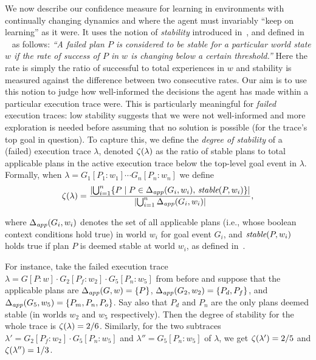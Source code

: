 We now describe our confidence measure for learning in environments with continually changing dynamics and where the agent must invariably ``keep on learning'' as it were. It uses the notion of {\em stability} introduced in~\cite{airiau09:enhancing}, and defined in ~\cite{singh10:learning} as follows:
%
\emph{``A failed plan $P$ is considered to be stable for a particular world state $w$ if the rate of success of $P$ in $w$ is changing below a certain threshold.''}
Here the rate is simply the ratio of successful to total experiences in $w$ and stability is measured against the difference between two consecutive rates.
%
Our aim is to use this notion to judge how  well-informed the decisions the agent has made within a particular execution trace were. This is particularly meaningful for \emph{failed} execution traces: low stability suggests that we were not well-informed and more exploration is needed before assuming that no solution is possible (for the trace's top goal in question).
To capture this, we define the \emph{degree of stability} of a (failed) execution trace $\lambda$, denoted $\zeta(\lambda)$ as the ratio of stable plans to total applicable plans in the active execution trace below the top-level goal event in $\lambda$. Formally, when $\lambda= G_1[P_1:w_1] \cdots G_n[P_n:w_n]$ we define 
\[
\zeta(\lambda) = 
	\frac{ 
			|{ \bigcup_{i=1}^n \{P \mid P \in \Delta_{\operatorname{\textit{app}}}(G_i,w_i),\, \operatorname{\textit{stable}}(P,w_i)\} }| 
		}
		{
			|{	\bigcup_{i=1}^n \Delta_{\operatorname{\textit{app}}}(G_i,w_i) }| 
		},
\]

\noindent
where  $\Delta_{\operatorname{\textit{app}}}(G_i,w_i)$ denotes the set of all applicable plans (i.e., whose boolean context conditions hold true) in world $w_i$ for goal event $G_i$, and $\operatorname{\textit{stable}}(P,w_i)$ holds true if plan $P$ is deemed stable at world $w_i$, as defined in~\cite{singh10:learning}.

For instance, take the failed execution trace $\lambda = G[P:w] \cdot G_2[P_f:w_2] \cdot G_5[P_n:w_5]$ from before and suppose that the applicable plans are $\Delta_{\operatorname{\textit{app}}}(G,w) = \{P\}$, $\Delta_{\operatorname{\textit{app}}}(G_2,w_2) = \{P_d,P_f\}$, and $\Delta_{\operatorname{\textit{app}}}(G_5,w_5) = \{P_m,P_n,P_o\}$. Say also that $P_d$ and $P_n$ are the only plans deemed stable (in worlds $w_2$ and $w_5$ respectively). 
Then the degree of stability for the whole trace is $\zeta(\lambda)= 2/6$.
Similarly, for the two subtraces $\lambda'= G_2[P_f:w_2] \cdot G_5[P_n:w_5]$ and $\lambda'' =G_5[P_n:w_5]$ of $\lambda$, we get $\zeta(\lambda') = 2/5$ and $\zeta(\lambda'') = 1/3$.



